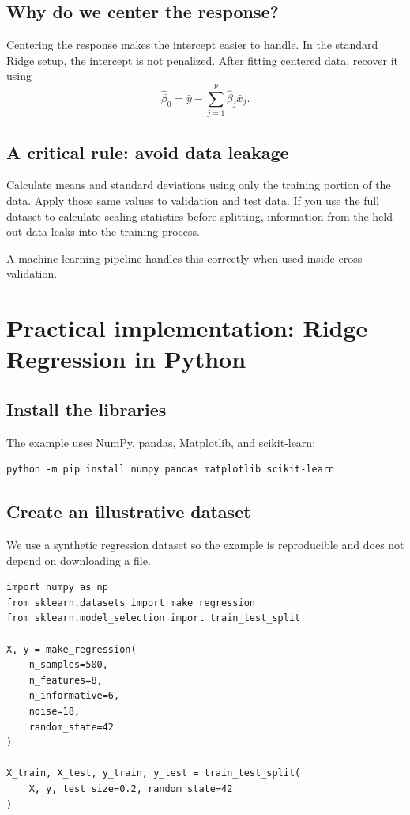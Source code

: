 \documentclass[11pt,a4paper,oneside]{book}
\theoremstyle{remark}
\begin{document}
\section{Why do we center the response?}
Centering the response makes the intercept easier to handle. In the standard
Ridge setup, the intercept is not penalized. After fitting centered data,
recover it using
\[
\boxed{\widehat\beta_0=\bar y-\sum_{j=1}^{p}\widehat\beta_j\bar x_j.}
\]

\section{A critical rule: avoid data leakage}
Calculate means and standard deviations using only the training portion of
the data. Apply those same values to validation and test data. If you use
the full dataset to calculate scaling statistics before splitting, information
from the held-out data leaks into the training process.

A machine-learning pipeline handles this correctly when used inside
cross-validation.

\chapter{Practical implementation: Ridge Regression in Python}

\section{Install the libraries}
The example uses NumPy, pandas, Matplotlib, and scikit-learn:
\begin{lstlisting}
python -m pip install numpy pandas matplotlib scikit-learn
\end{lstlisting}

\section{Create an illustrative dataset}
We use a synthetic regression dataset so the example is reproducible and
does not depend on downloading a file.

\begin{lstlisting}
import numpy as np
from sklearn.datasets import make_regression
from sklearn.model_selection import train_test_split

X, y = make_regression(
    n_samples=500,
    n_features=8,
    n_informative=6,
    noise=18,
    random_state=42
)

X_train, X_test, y_train, y_test = train_test_split(
    X, y, test_size=0.2, random_state=42
)
\end{lstlisting}
\end{document}
